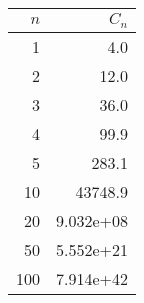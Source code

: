 \begin{tabular}{rr}
\toprule
 $n$ &     $C_n$ \\
\midrule
   1 &       4.0 \\
   2 &      12.0 \\
   3 &      36.0 \\
   4 &      99.9 \\
   5 &     283.1 \\
  10 &   43748.9 \\
  20 & 9.032e+08 \\
  50 & 5.552e+21 \\
 100 & 7.914e+42 \\
\bottomrule
\end{tabular}
